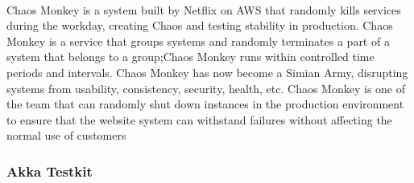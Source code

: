 \documentclass{article}
\begin{document}
\paragraph{}\vspace{11pt}\justifying
Chaos Monkey is a system built by Netflix on AWS that randomly kills services during the workday, creating Chaos and testing stability in production\cite{bennett2012chaos}. Chaos Monkey is a service that groups systems and randomly terminates a part of a system that belongs to a group;Chaos Monkey runs within controlled time periods and intervals. Chaos Monkey has now become a Simian Army, disrupting systems from usability, consistency, security, health, etc. Chaos Monkey is one of the team that can randomly shut down instances in the production environment to ensure that the website system can withstand failures without affecting the normal use of customers\\

\subsubsection{Akka Testkit}\vspace{16pt}
\paragraph{}\vspace{11pt}\justifying

\newpage


\end{document}
